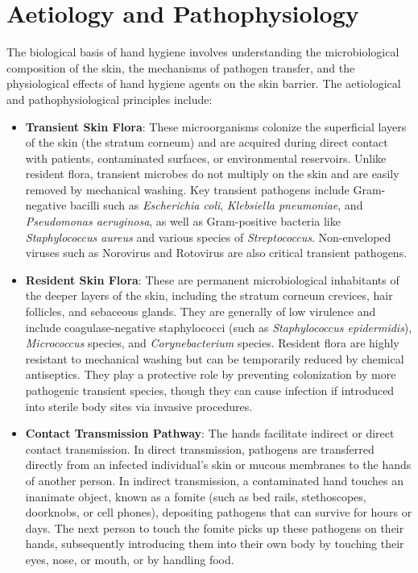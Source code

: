 \section*{Aetiology and Pathophysiology}
The biological basis of hand hygiene involves understanding the microbiological composition of the skin, the mechanisms of pathogen transfer, and the physiological effects of hand hygiene agents on the skin barrier. The aetiological and pathophysiological principles include:
\begin{itemize}
    \item \textbf{Transient Skin Flora}: These microorganisms colonize the superficial layers of the skin (the stratum corneum) and are acquired during direct contact with patients, contaminated surfaces, or environmental reservoirs. Unlike resident flora, transient microbes do not multiply on the skin and are easily removed by mechanical washing. Key transient pathogens include Gram-negative bacilli such as \textit{Escherichia coli}, \textit{Klebsiella pneumoniae}, and \textit{Pseudomonas aeruginosa}, as well as Gram-positive bacteria like \textit{Staphylococcus aureus} and various species of \textit{Streptococcus}. Non-enveloped viruses such as Norovirus and Rotovirus are also critical transient pathogens.
    \item \textbf{Resident Skin Flora}: These are permanent microbiological inhabitants of the deeper layers of the skin, including the stratum corneum crevices, hair follicles, and sebaceous glands. They are generally of low virulence and include coagulase-negative staphylococci (such as \textit{Staphylococcus epidermidis}), \textit{Micrococcus} species, and \textit{Corynebacterium} species. Resident flora are highly resistant to mechanical washing but can be temporarily reduced by chemical antiseptics. They play a protective role by preventing colonization by more pathogenic transient species, though they can cause infection if introduced into sterile body sites via invasive procedures.
    \item \textbf{Contact Transmission Pathway}: The hands facilitate indirect or direct contact transmission. In direct transmission, pathogens are transferred directly from an infected individual's skin or mucous membranes to the hands of another person. In indirect transmission, a contaminated hand touches an inanimate object, known as a fomite (such as bed rails, stethoscopes, doorknobs, or cell phones), depositing pathogens that can survive for hours or days. The next person to touch the fomite picks up these pathogens on their hands, subsequently introducing them into their own body by touching their eyes, nose, or mouth, or by handling food.

\end{itemize}

